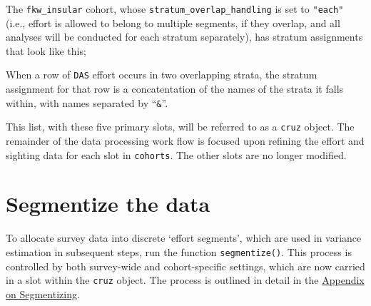 \documentclass[
]{book}
\newenvironment{Shaded}{\begin{snugshade}}{\end{snugshade}}
\newcommand{\DataTypeTok}[1]{\textcolor[rgb]{0.13,0.29,0.53}{#1}}
\newcommand{\DecValTok}[1]{\textcolor[rgb]{0.00,0.00,0.81}{#1}}
\newcommand{\KeywordTok}[1]{\textcolor[rgb]{0.13,0.29,0.53}{\textbf{#1}}}
\newcommand{\NormalTok}[1]{#1}
\newcommand{\OperatorTok}[1]{\textcolor[rgb]{0.81,0.36,0.00}{\textbf{#1}}}
\newcommand{\StringTok}[1]{\textcolor[rgb]{0.31,0.60,0.02}{#1}}
\begin{document}
\begin{Shaded}
\end{Shaded}

The \texttt{fkw\_insular} cohort, whose \texttt{stratum\_overlap\_handling} is set to \texttt{"each"} (i.e., effort is allowed to belong to multiple segments, if they overlap, and all analyses will be conducted for each stratum separately), has stratum assignments that look like this;

\begin{Shaded}
\end{Shaded}

When a row of \texttt{DAS} effort occurs in two overlapping strata, the stratum assignment for that row is a concatentation of the names of the strata it falls within, with names separated by ``\texttt{\&}''.

This list, with these five primary slots, will be referred to as a \texttt{cruz} object. The remainder of the data processing work flow is focused upon refining the effort and sighting data for each slot in \texttt{cohorts}. The other slots are no longer modified.

\hypertarget{segmentize-the-data}{%
\section*{Segmentize the data}\label{segmentize-the-data}}

To allocate survey data into discrete `effort segments', which are used in variance estimation in subsequent steps, run the function \texttt{segmentize()}. This process is controlled by both survey-wide and cohort-specific \protect\hypertarget{settings}{}{settings}, which are now carried in a slot within the \texttt{cruz} object. The process is outlined in detail in the \protect\hyperlink{segmentizing}{Appendix on Segmentizing}.
\end{document}

